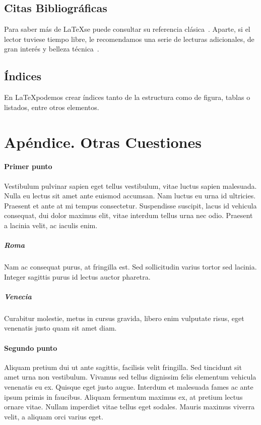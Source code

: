 \documentclass{article}
\begin{document}
\subsection{Citas Bibliográficas}

Para saber más de \LaTeX se puede consultar su referencia clásica~\cite{lamport:1994}. Aparte, si el lector tuviese tiempo libre, le recomendamos una serie de lecturas adicionales, de gran interés y belleza técnica~\cite{DelaVegaReview2019,DelaVegaQUATIC2018,DelaVegaSLATE2015,DelaVegaFLANDM2018,DelaVegaERFORUM2017}.

\subsection{Índices}

En \LaTeX podemos crear índices tanto de la estructura como de figura, tablas o listados, entre otros elementos.




\section*{Apéndice. Otras Cuestiones}

\paragraph{Primer punto}

Vestibulum pulvinar sapien eget tellus vestibulum, vitae luctus sapien malesuada. Nulla eu lectus sit amet ante euismod accumsan. Nam luctus eu urna id ultricies. Praesent et ante at mi tempus consectetur. Suspendisse suscipit, lacus id vehicula consequat, dui dolor maximus elit, vitae interdum tellus urna nec odio. Praesent a lacinia velit, ac iaculis enim. \subparagraph {Roma} Nam ac consequat purus, at fringilla est. Sed sollicitudin varius tortor sed lacinia. Integer sagittis purus id lectus auctor pharetra. \subparagraph {Venecia} Curabitur molestie, metus in cursus gravida, libero enim vulputate risus, eget venenatis justo quam sit amet diam.

\paragraph{Segundo punto}

Aliquam pretium dui ut ante sagittis, facilisis velit fringilla. Sed tincidunt sit amet urna non vestibulum. Vivamus sed tellus dignissim felis elementum vehicula venenatis eu ex. Quisque eget justo augue. Interdum et malesuada fames ac ante ipsum primis in faucibus. Aliquam fermentum maximus ex, at pretium lectus ornare vitae. Nullam imperdiet vitae tellus eget sodales. Mauris maximus viverra velit, a aliquam orci varius eget.
\end{document}
